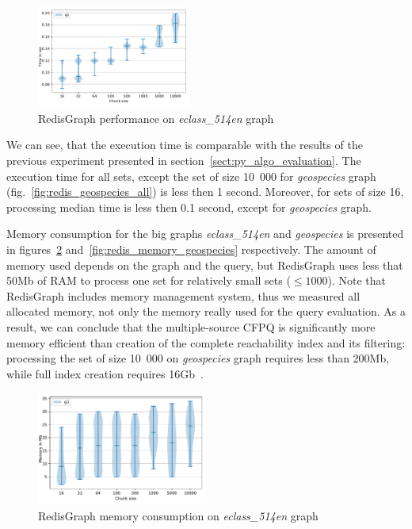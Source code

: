 \begin{figure}[h]
\centering
\includegraphics[width=0.45\textwidth]{data/raw_redis/eclass_514en.pdf}
\caption{RedisGraph performance on \textit{eclass\_514en} graph}
\label{fig:redis_eclass_all}
\end{figure}


We can see, that the execution time is comparable with the results of the previous experiment presented in section~\ref{sect:py_algo_evaluation}.
The execution time for all sets, except the set of size 10~000 for \textit{geospecies} graph (fig.~\ref{fig:redis_geospecies_all}) is less then 1 second.
Moreover, for sets of size 16, processing median time is less then 0.1 second, except for \textit{geospecies} graph.

Memory consumption for the big graphs \textit{eclass\_514en} and \textit{geospecies} is presented in figures~\ref{fig:redis_memory_eclass} and~\ref{fig:redis_memory_geospecies} respectively.
The amount of memory used depends on the graph and the query, but RedisGraph uses less that 50Mb of RAM to process one set for relatively small sets ($\leq 1000$).
Note that RedisGraph includes memory management system, thus we measured all allocated memory, not only the memory really used for the query evaluation.
As a result, we can conclude that the multiple-source CFPQ is significantly more memory efficient than creation of the complete reachability index and its filtering: processing the set of size 10~000 on \textit{geospecies} graph requires less than 200Mb, while full index creation requires 16Gb~\cite{10.1145/3398682.3399163}.

\begin{figure}[h]
\centering
\includegraphics[width=0.5\textwidth]{data/raw_memory/eclass_514en.pdf}
\caption{RedisGraph memory consumption on \textit{eclass\_514en} graph}
\label{fig:redis_memory_eclass}
\end{figure}

